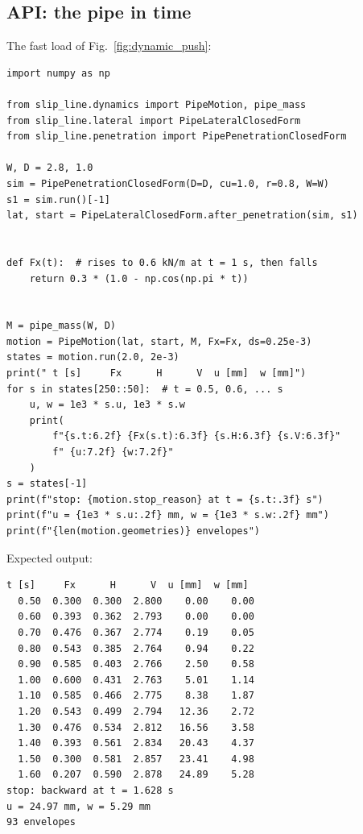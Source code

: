 \documentclass[11pt,a4paper]{article}
\begin{document}
\subsection{API: the pipe in time}

The fast load of Fig.~\ref{fig:dynamic_push}:
\begin{lstlisting}
import numpy as np

from slip_line.dynamics import PipeMotion, pipe_mass
from slip_line.lateral import PipeLateralClosedForm
from slip_line.penetration import PipePenetrationClosedForm

W, D = 2.8, 1.0
sim = PipePenetrationClosedForm(D=D, cu=1.0, r=0.8, W=W)
s1 = sim.run()[-1]
lat, start = PipeLateralClosedForm.after_penetration(sim, s1)


def Fx(t):  # rises to 0.6 kN/m at t = 1 s, then falls
    return 0.3 * (1.0 - np.cos(np.pi * t))


M = pipe_mass(W, D)
motion = PipeMotion(lat, start, M, Fx=Fx, ds=0.25e-3)
states = motion.run(2.0, 2e-3)
print(" t [s]     Fx      H      V  u [mm]  w [mm]")
for s in states[250::50]:  # t = 0.5, 0.6, ... s
    u, w = 1e3 * s.u, 1e3 * s.w
    print(
        f"{s.t:6.2f} {Fx(s.t):6.3f} {s.H:6.3f} {s.V:6.3f}"
        f" {u:7.2f} {w:7.2f}"
    )
s = states[-1]
print(f"stop: {motion.stop_reason} at t = {s.t:.3f} s")
print(f"u = {1e3 * s.u:.2f} mm, w = {1e3 * s.w:.2f} mm")
print(f"{len(motion.geometries)} envelopes")
\end{lstlisting}

Expected output:
\begin{lstlisting}[numbers=none]
 t [s]     Fx      H      V  u [mm]  w [mm]
  0.50  0.300  0.300  2.800    0.00    0.00
  0.60  0.393  0.362  2.793    0.00    0.00
  0.70  0.476  0.367  2.774    0.19    0.05
  0.80  0.543  0.385  2.764    0.94    0.22
  0.90  0.585  0.403  2.766    2.50    0.58
  1.00  0.600  0.431  2.763    5.01    1.14
  1.10  0.585  0.466  2.775    8.38    1.87
  1.20  0.543  0.499  2.794   12.36    2.72
  1.30  0.476  0.534  2.812   16.56    3.58
  1.40  0.393  0.561  2.834   20.43    4.37
  1.50  0.300  0.581  2.857   23.41    4.98
  1.60  0.207  0.590  2.878   24.89    5.28
stop: backward at t = 1.628 s
u = 24.97 mm, w = 5.29 mm
93 envelopes
\end{lstlisting}
\end{document}
